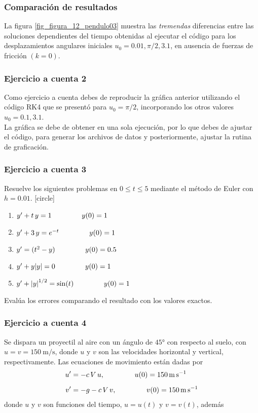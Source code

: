\begin{frame}
\frametitle{Comparación de resultados}
La figura \ref{fig_figura_12_pendulo03} muestra las \emph{tremendas} diferencias entre las soluciones dependientes del tiempo obtenidas al ejecutar el código para los desplazamientos angulares iniciales $u_{0} = 0.01, \pi / 2, 3.1$, en ausencia de fuerzas de fricción $(k = 0)$.
\end{frame}
\begin{frame}
\frametitle{Ejercicio a cuenta 2}
Como ejercicio a cuenta debes de reproducir la gráfica anterior utilizando el código RK4 que se presentó para $u_{0} = \pi/2$, incorporando los otros valores $u_{0} = 0.1, 3.1$.
\\
\bigskip
La gráfica se debe de obtener en una sola ejecución, por lo que debes de ajustar el código, para generar los archivos de datos y posteriormente, ajustar la rutina de graficación.
\end{frame}
\begin{frame}
\frametitle{Ejercicio a cuenta 3}
Resuelve los siguientes problemas en $0 \leq t \leq 5$ mediante el método de Euler con $h = 0.01$.
[circle]
\begin{enumerate}
\item ${y}^{\prime} + t \, y = 1 \hspace{1.5cm} y(0)=1$
\item ${y}^{\prime} + 3 \, y = e^{-t} \hspace{1.5cm} y(0)=1$
\item ${y}^{\prime}= (t^{2} - y) \hspace{1.5cm} y(0)=0.5$
\item ${y}^{\prime} + y \abs{y} = 0 \hspace{1.5cm} y(0)=1$
\item ${y}^{\prime} + \abs{y}^{1/2} = \sin(t) \hspace{1.5cm} y(0)=1$
\end{enumerate}
Evalúa los errores comparando el resultado con los valores exactos.
\end{frame}
\begin{frame}
\frametitle{Ejercicio a cuenta 4}
Se dispara un proyectil al aire con un ángulo de $\ang{45}$ con respecto al suelo, con $u = v = \SI{150}{\meter\per\second}$, donde $u$ y $v$ son las velocidades horizontal y vertical, respectivamente. Las ecuaciones de movimiento están dadas por
\begin{align*}
{u}^{\prime} & = -c \, V \, u, \hspace{1.5cm} u(0) = \SI{150}{\meter\per\second} \\[0.5em]
{v}^{\prime} & = -g - c \, V \, v, \hspace{1.5cm} v(0) = \SI{150}{\meter\per\second}
\end{align*}
donde $u$ y $v$ son funciones del tiempo, $u = u(t)$ y $v = v(t)$, además
\end{frame}
